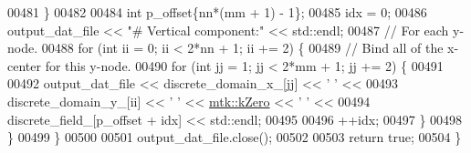 \begin{DoxyCode}
00481     \}
00482 
00484     \textcolor{keywordtype}{int} p\_offset\{nn*(mm + 1) - 1\};
00485     idx = 0;
00486     output\_dat\_file << \textcolor{stringliteral}{"# Vertical component:"} << std::endl;
00487     \textcolor{comment}{// For each y-node.}
00488     \textcolor{keywordflow}{for} (\textcolor{keywordtype}{int} ii = 0; ii < 2*nn + 1; ii += 2) \{
00489       \textcolor{comment}{// Bind all of the x-center for this y-node.}
00490       \textcolor{keywordflow}{for} (\textcolor{keywordtype}{int} jj = 1; jj < 2*mm + 1; jj += 2) \{
00491 
00492         output\_dat\_file << discrete\_domain\_x\_[jj] << \textcolor{charliteral}{' '} <<
00493           discrete\_domain\_y\_[ii] << \textcolor{charliteral}{' '} << \hyperlink{group__c01-roots_ga59a451a5fae30d59649bcda274fea271}{mtk::kZero} << \textcolor{charliteral}{' '} <<
00494           discrete\_field\_[p\_offset + idx] << std::endl;
00495 
00496         ++idx;
00497       \}
00498     \}
00499   \}
00500 
00501   output\_dat\_file.close();
00502 
00503   \textcolor{keywordflow}{return} \textcolor{keyword}{true};
00504 \}
\end{DoxyCode}
